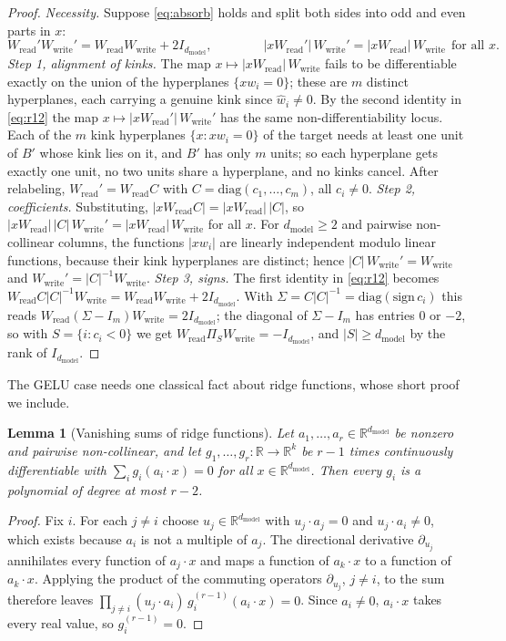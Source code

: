 \documentclass[10pt]{article}
\newtheorem{lemma}[theorem]{Lemma}
\theoremstyle{definition}
\theoremstyle{remark}
\newcommand{\R}{\mathbb{R}}
\newcommand{\Wread}{W_{\mathrm{read}}}
\newcommand{\Wwrite}{W_{\mathrm{write}}}
\newcommand{\dm}{d_{\mathrm{model}}}
\begin{document}
\begin{proof}
\emph{Necessity.} Suppose \eqref{eq:absorb} holds and split both sides into odd and even parts in $x$:
\begin{equation}\label{eq:r12}
\Wread'\Wwrite' = \Wread\Wwrite + 2I_{\dm},\qquad\qquad |x\Wread'|\,\Wwrite' = |x\Wread|\,\Wwrite\ \ \text{for all } x .
\end{equation}
\emph{Step 1, alignment of kinks.} The map $x \mapsto |x\Wread|\,\Wwrite$ fails to be differentiable exactly on the union of the hyperplanes $\{x w_i = 0\}$; these are $m$ distinct hyperplanes, each carrying a genuine kink since $\hat w_i \neq 0$. By the second identity in \eqref{eq:r12} the map $x \mapsto |x\Wread'|\,\Wwrite'$ has the same non-differentiability locus. Each of the $m$ kink hyperplanes $\{x : x w_i = 0\}$ of the target needs at least one unit of $B'$ whose kink lies on it, and $B'$ has only $m$ units; so each hyperplane gets exactly one unit, no two units share a hyperplane, and no kinks cancel. After relabeling, $\Wread' = \Wread C$ with $C = \mathrm{diag}(c_1, \dots, c_m)$, all $c_i \neq 0$.
\emph{Step 2, coefficients.} Substituting, $|x\Wread C| = |x\Wread|\,|C|$, so $|x\Wread|\,|C|\,\Wwrite' = |x\Wread|\,\Wwrite$ for all $x$. For $\dm \ge 2$ and pairwise non-collinear columns, the functions $|x w_i|$ are linearly independent modulo linear functions, because their kink hyperplanes are distinct; hence $|C|\,\Wwrite' = \Wwrite$ and $\Wwrite' = |C|^{-1}\Wwrite$.
\emph{Step 3, signs.} The first identity in \eqref{eq:r12} becomes $\Wread C|C|^{-1}\Wwrite = \Wread\Wwrite + 2I_{\dm}$. With $\Sigma = C|C|^{-1} = \mathrm{diag}(\mathrm{sign}\,c_i)$ this reads $\Wread(\Sigma - I_m)\Wwrite = 2I_{\dm}$; the diagonal of $\Sigma - I_m$ has entries $0$ or $-2$, so with $S = \{i : c_i < 0\}$ we get $\Wread\Pi_S\Wwrite = -I_{\dm}$, and $|S| \ge \dm$ by the rank of $I_{\dm}$.
\end{proof}

The GELU case needs one classical fact about ridge functions, whose short proof we include.

\begin{lemma}[Vanishing sums of ridge functions]\label{lem:ridge}
Let $a_1, \dots, a_r \in \R^{\dm}$ be nonzero and pairwise non-collinear, and let $g_1, \dots, g_r : \R \to \R^k$ be $r-1$ times continuously differentiable with $\sum_{i} g_i(a_i\cdot x) = 0$ for all $x \in \R^{\dm}$. Then every $g_i$ is a polynomial of degree at most $r-2$.
\end{lemma}
\begin{proof}
Fix $i$. For each $j \neq i$ choose $u_j \in \R^{\dm}$ with $u_j\cdot a_j = 0$ and $u_j\cdot a_i \neq 0$, which exists because $a_i$ is not a multiple of $a_j$. The directional derivative $\partial_{u_j}$ annihilates every function of $a_j\cdot x$ and maps a function of $a_k\cdot x$ to a function of $a_k\cdot x$. Applying the product of the commuting operators $\partial_{u_j}$, $j \neq i$, to the sum therefore leaves $\prod_{j \neq i}(u_j\cdot a_i)\, g_i^{(r-1)}(a_i\cdot x) = 0$. Since $a_i \neq 0$, $a_i\cdot x$ takes every real value, so $g_i^{(r-1)} = 0$.
\end{proof}
\end{document}
